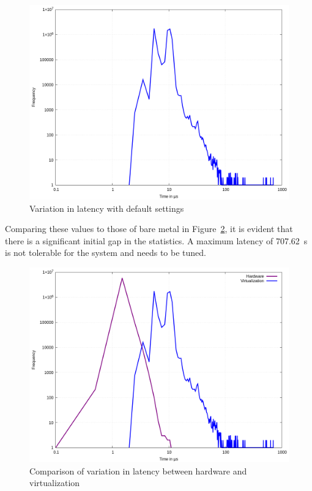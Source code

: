 \documentclass[MMR,Master,english]{twbook}
\begin{document}
\begin{figure}[H]
	\centering
	\includegraphics[width=0.7\columnwidth]{masterthesis-documentation/docs/sigmatek/xenomai/1default/gnuplot_max_latency_default.png}
	\caption[Variation in latency with default settings]{Variation in latency with default settings}
	\label{fig:gnuplot_max_latency_default}
\end{figure}


\noindent Comparing these values to those of bare metal in Figure~\ref{fig:gnuplot_max_latency_combined}, it is evident that there is a significant initial gap in the statistics. A maximum latency of 707.62~\textmu s is not tolerable for the system and needs to be tuned.

\begin{figure}[H]
	\centering
	\includegraphics[width=0.7\columnwidth]{masterthesis-documentation/docs/sigmatek/xenomai/01combined/gnuplot_combined_max_latency.png}
	\caption[Comparison of variation in latency between hardware and virtualization]{Comparison of variation in latency between hardware and virtualization}
	\label{fig:gnuplot_max_latency_combined}
\end{figure}
\end{document}
